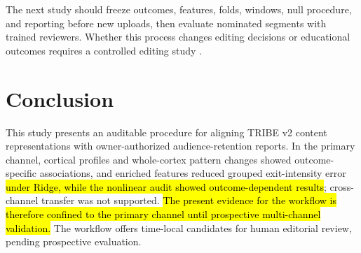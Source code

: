 \documentclass{ieeeaccess}
\newcommand{\rev}[1]{\hl{#1}}
\newcommand{\rev}[1]{#1}
\begin{document}
The next study should freeze outcomes, features, folds, windows, null procedure, and reporting before new uploads, then evaluate nominated segments with trained reviewers. Whether this process changes editing decisions or educational outcomes requires a controlled editing study \cite{shadish2002experimental}.

\section{Conclusion}
\label{sec:conclusion}

This study presents an auditable procedure for aligning TRIBE v2 content representations with owner-authorized audience-retention reports. In the primary channel, cortical profiles and whole-cortex pattern changes showed outcome-specific associations, and enriched features reduced grouped exit-intensity error\rev{ under Ridge, while the nonlinear audit showed outcome-dependent results}; cross-channel transfer was not supported. \rev{The present evidence for the workflow is therefore confined to the primary channel until prospective multi-channel validation.} The workflow offers time-local candidates for human editorial review, pending prospective evaluation.

\raggedbottom


\begingroup
\raggedbottom
\end{document}
